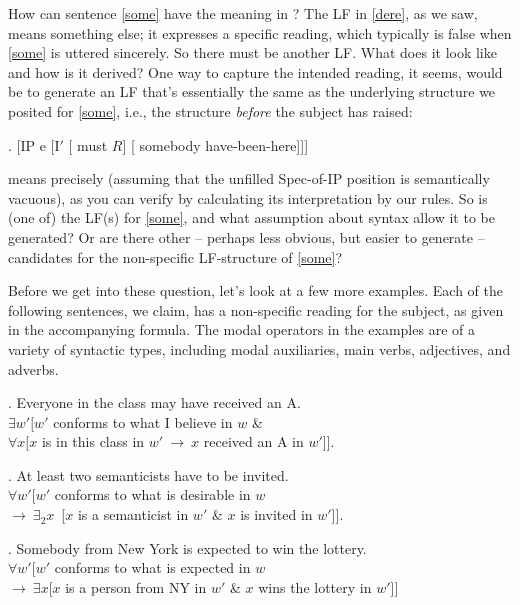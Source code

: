How can sentence \ref{some} have the meaning in \Last? The LF in \ref{dere}, as we saw, means something else; it expresses a specific reading, which typically is false when \ref{some} is uttered sincerely. So there must be another LF. What does it look like and how is it derived? One way to capture the intended reading, it seems, would be to generate an LF that's essentially the same as the underlying structure we posited for \ref{some}, i.e., the structure \emph{before} the subject has raised:

\ex. [IP e [I$'$ [ must $R$] [ somebody have-been-here]]]

\Last means precisely \LLast (assuming that the unfilled Spec-of-IP position is semantically vacuous), as you can verify by calculating its interpretation by our rules. So is \Last (one of) the LF(s) for \ref{some}, and what assumption about syntax allow it to be generated? Or are there other -- perhaps less obvious, but easier to generate -- candidates for the non-specific LF-structure of \ref{some}?

Before we get into these question, let's look at a few more examples. Each of the following sentences, we claim, has a non-specific reading for the subject, as given in the accompanying formula. The modal operators in the examples are of a variety of syntactic types, including modal auxiliaries, main verbs, adjectives, and adverbs.

\ex. \label{everymay} Everyone in the class may have received an A.\\
$\exists w'[w'$ conforms to what I believe in $w$ \&\\
\null\hfill$\forall x[x$ is in this class in $w'\ \rightarrow\ x$ received an A in $w'$]].

\ex. At least two semanticists have to be invited.\\
$\forall w'[w'$ conforms to what is desirable in $w$\\
\null\hfill$ \rightarrow\ \exists_2 x$\ [$x$ is a semanticist in $w'$ \& $x$ is invited in $w'$]].

\ex. \label{ny} Somebody from New York is expected to win the lottery.\\
$\forall w'[w'$ conforms to what is expected in $w$\\
\null\hfill$ \rightarrow\ \exists x[x$ is a person from NY in $w'$ \& $x$ wins the lottery in $w'$]]

